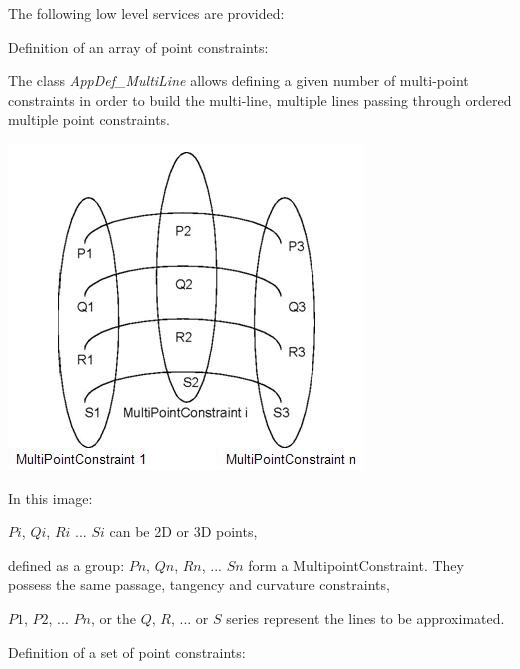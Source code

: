 The following low level services are provided\+:


\begin{DoxyItemize}
\item Definition of an array of point constraints\+:

The class {\itshape App\+Def\+\_\+\+Multi\+Line} allows defining a given number of multi-\/point constraints in order to build the multi-\/line, multiple lines passing through ordered multiple point constraints.

 
\begin{DoxyImage}
\begin{center}
 \includegraphics[width=\textwidth,height=\textheight/2,keepaspectratio=true]{modeling_data_image004.png}
\end{center}
\caption{Definition of a Multi\+Line using Multiple Point Constraints}
\end{DoxyImage}
 In this image\+:
\begin{DoxyItemize}
\item $Pi$, $Qi$, $Ri$ ... $Si$ can be 2D or 3D points,
\item defined as a group\+: $Pn$, $Qn$, $Rn$, ... $Sn$ form a Multipoint\+Constraint. They possess the same passage, tangency and curvature constraints,
\item $P1$, $P2$, ... $Pn$, or the $Q$, $R$, ... or $S$ series represent the lines to be approximated.
\end{DoxyItemize}
\item Definition of a set of point constraints\+:


\end{DoxyItemize}
